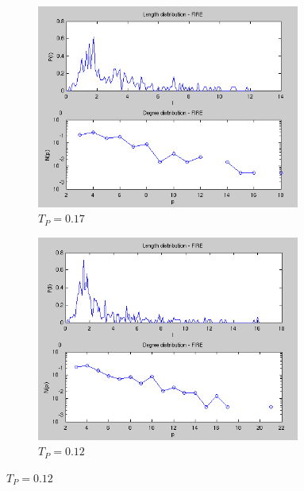 \begin{figure}[H]
  \centering
  \begin{subfigure}{0.5\textwidth}
    \centering
    \includegraphics[width=0.95\textwidth]{Figures/chapter-image/fire/fire017histo.png}%
    \caption{$T_P=0.17$}
    \label{firehisto017}
  \end{subfigure}%
  \begin{subfigure}{0.5\textwidth}
    \centering
    \includegraphics[width=0.95\textwidth]{Figures/chapter-image/fire/fire012histo.png}%
    \caption{$T_P=0.12$}
    \label{firehisto012}
  \end{subfigure}


\end{figure}
